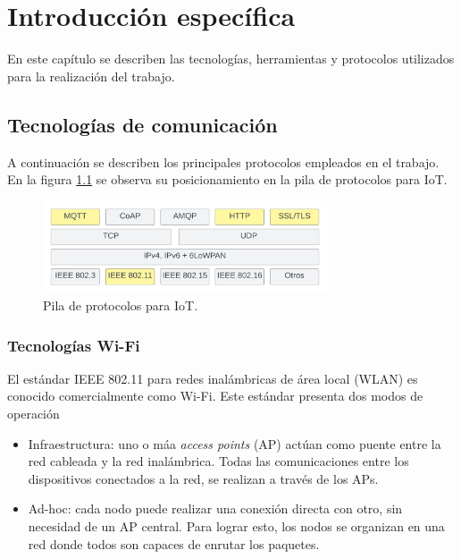 \chapter{Introducción específica} %

\label{Chapter2}

En este capítulo se describen las tecnologías, herramientas y protocolos utilizados para la realización del trabajo.

\section{Tecnologías de comunicación}
\label{sec:Tecnologías de comunicación}
A continuación se describen los principales protocolos empleados en el trabajo. En la figura \ref{fig:IotProtocols} se observa su posicionamiento en la pila de protocolos para IoT.

\begin{figure}[h]
	\centering
	\includegraphics[width=0.75\textwidth]{./Figures/protocols.jpeg}
	\caption[Pila de protocolos para IoT.]{Pila de protocolos para IoT\protect\footnotemark.}
	\label{fig:IotProtocols}

\end{figure}

\subsection{Tecnologías Wi-Fi}
\label{sec:Tecnologías Wi-Fi}
El estándar IEEE 802.11 para redes inalámbricas de área local (WLAN) es conocido comercialmente como Wi-Fi. Este estándar presenta dos modos de operación \citep{wifi}
\begin{itemize}
\item Infraestructura: uno o máa \textit{access points} (AP) actúan como puente entre la red cableada y la red inalámbrica. Todas las comunicaciones entre los dispositivos conectados a la red, se realizan a través de los APs. 
\item Ad-hoc: cada nodo puede realizar una conexión directa con otro, sin necesidad de un AP central. Para lograr esto, los nodos se organizan en una red donde todos son capaces de enrutar los paquetes.  
\end{itemize}

